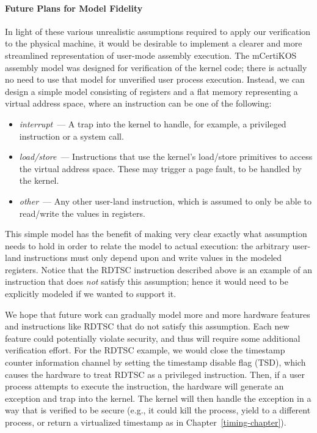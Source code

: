 \paragraph{Future Plans for Model Fidelity}
In light of these various unrealistic assumptions required to apply our
verification to the physical machine, it would be desirable to implement
a clearer and more streamlined representation of user-mode assembly 
execution. The mCertiKOS assembly model was designed for verification
of the kernel code; there is actually no need to use that model for unverified
user process execution. Instead, we can design a simple model consisting
of registers and a flat memory representing a virtual address space, where
an instruction can be one of the following:
\begin{itemize}
\item \emph{interrupt}~--- A trap into the kernel to handle, for example, 
a privileged instruction or a system call.
\item \emph{load/store}~--- Instructions that use the kernel's load/store
primitives to access the virtual address space. These may trigger a page 
fault, to be handled by the kernel.
\item \emph{other}~--- Any other user-land instruction, which is assumed
to only be able to read/write the values in registers.
\end{itemize}

This simple model has the benefit of making very clear exactly what 
assumption needs to hold in order to relate the model to actual execution:
the arbitrary user-land instructions must only depend upon and write
values in the modeled registers. Notice that the RDTSC instruction
described above is an example of an instruction that does \emph{not}
satisfy this assumption; hence it would need to be explicitly modeled
if we wanted to support it.

We hope that future work can gradually model more and more hardware 
features and instructions like RDTSC that do not satisfy this assumption.
Each new feature could potentially violate security, and thus will 
require some additional verification effort. For the RDTSC example, we
would close the timestamp counter information channel by setting the
timestamp disable flag (TSD), which causes the hardware to treat
RDTSC as a privileged instruction. Then, if a user process attempts to 
execute the instruction, the hardware will generate an exception and 
trap into the kernel. The kernel will then handle the exception in a way
that is verified to be secure (e.g., it could kill the process, 
yield to a different process, or return a virtualized timestamp as
in Chapter~\ref{timing-chapter}).

